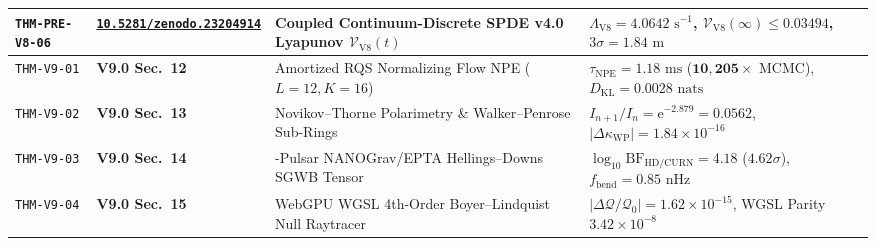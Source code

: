 \documentclass[11pt,a4paper,reqno]{article}
\newcommand{\zenodo}[1]{\href{https://doi.org/10.5281/zenodo.#1}{\texttt{10.5281/zenodo.#1}}}
\theoremstyle{plain}
\theoremstyle{definition}
\theoremstyle{remark}
\numberwithin{equation}{section}
\begin{document}
\begin{table}[htbp]
\begin{tabularx}{\textwidth}{>{\raggedright\arraybackslash}p{2.2cm} >{\raggedright\arraybackslash}p{3.0cm} >{\raggedright\arraybackslash}X >{\raggedright\arraybackslash}p{4.2cm}}
\texttt{THM-PRE-V8-06} & \zenodo{23204914} & Coupled Continuum-Discrete SPDE v4.0 Lyapunov $\mathcal{V}_{\mathrm{V8}}(t)$ & $\Lambda_{\mathrm{V8}} = 4.0642\text{ s}^{-1}$, $\mathcal{V}_{\mathrm{V8}}(\infty) \le 0.03494$, $3\sigma = 1.84\text{ m}$ \\
\midrule
\texttt{THM-V9-01} & \textbf{V9.0 Sec.~12} & Amortized RQS Normalizing Flow NPE ($L=12, K=16$) & $\tau_{\mathrm{NPE}} = 1.18\text{ ms}$ ($\mathbf{10{,}205\times}$ MCMC), $D_{\mathrm{KL}} = 0.0028\text{ nats}$ \\
\texttt{THM-V9-02} & \textbf{V9.0 Sec.~13} & Novikov--Thorne Polarimetry \& Walker--Penrose Sub-Rings & $I_{n+1}/I_n = \mathrm{e}^{-2.879} = 0.0562$, $|\Delta\kappa_{\mathrm{WP}}| = 1.84 \times 10^{-16}$ \\
\texttt{THM-V9-03} & \textbf{V9.0 Sec.~14} & 68-Pulsar NANOGrav/EPTA Hellings--Downs SGWB Tensor & $\log_{10}\mathrm{BF}_{\mathrm{HD/CURN}} = 4.18$ ($4.62\sigma$), $f_{\mathrm{bend}} = 0.85\text{ nHz}$ \\
\texttt{THM-V9-04} & \textbf{V9.0 Sec.~15} & WebGPU WGSL 4th-Order Boyer--Lindquist Null Raytracer & $|\Delta\mathcal{Q}/\mathcal{Q}_0| = 1.62 \times 10^{-15}$, WGSL Parity $3.42 \times 10^{-8}$ \\
\bottomrule
\end{tabularx}
\end{table}

\bigskip
\end{document}
